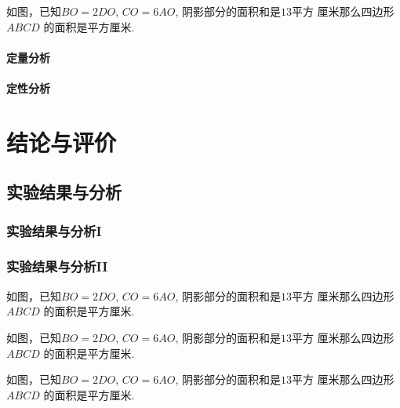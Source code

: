 \documentclass{USTBBook}
\begin{document}
\begin{question*}
  如图，已知$BO=2DO$, $CO=6AO$, 阴影部分的面积和是$13$平方
  厘米那么四边形 $ABCD$ 的面积是\fillin[]平方厘米.
\end{question*}

\subsection{定量分析}

\zhlipsum[16]

\subsection{定性分析}

\zhlipsum[17]

\part{结论与评价}


\chapter{实验结果与分析}

\section{实验结果与分析I}

\zhlipsum[14]

\section{实验结果与分析II}

\begin{question}
  如图，已知$BO=2DO$, $CO=6AO$, 阴影部分的面积和是$13$平方
  厘米那么四边形 $ABCD$ 的面积是\fillin[]平方厘米.
\end{question}

\begin{question}
  如图，已知$BO=2DO$, $CO=6AO$, 阴影部分的面积和是$13$平方
  厘米那么四边形 $ABCD$ 的面积是\fillin[]平方厘米.
\end{question}

\begin{question}
  如图，已知$BO=2DO$, $CO=6AO$, 阴影部分的面积和是$13$平方
  厘米那么四边形 $ABCD$ 的面积是\fillin[]平方厘米.
\end{question}
\end{document}

